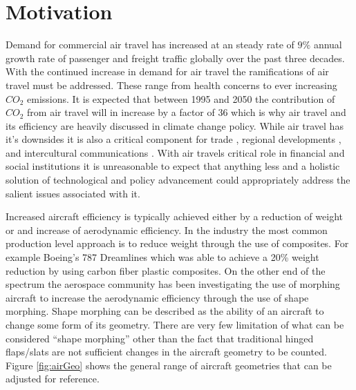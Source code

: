\documentclass[11pt]{ucthesis}
\begin{document}
\section{Motivation}
Demand for commercial air travel has increased at an steady rate of $9\%$ annual growth rate of passenger and freight traffic globally over the past three decades. \cite{upham2003environmental} With the continued increase in demand for air travel the ramifications of air travel must be addressed. These range from health concerns to ever increasing $CO_2$ emissions. It is expected that between 1995 and 2050 the contribution of $CO_2$ from air travel will in increase by a factor of 36 which is why air travel and its efficiency are heavily discussed in climate change policy. \cite{olsthoorn2001carbon} While air travel has it's downsides it is also a critical component for trade \cite{smith2001world}, regional developments \cite{marazzo2010air}, and intercultural communications \cite{adey2007flying}. With air travels critical role in financial and social institutions it is unreasonable to expect that anything less and a holistic solution of technological and policy advancement could appropriately address the salient issues associated with it.

Increased aircraft efficiency is typically achieved either by a reduction of weight or and increase of aerodynamic efficiency. In the industry the most common production level approach is to reduce weight through the use of composites. For example Boeing's 787 Dreamlines which was able to achieve a 20\% weight reduction by using carbon fiber plastic composites. \cite{hale2006boeing} On the other end of the spectrum the aerospace community has been investigating the use of morphing aircraft to increase the aerodynamic efficiency through the use of shape morphing.\cite{barbarino2011review,kuzmina2002review,sofla2010shape} Shape morphing can be described as the ability of an aircraft to change some form of its geometry. There are very few limitation of what can be considered ``shape morphing'' other than the fact that traditional hinged flaps/slats are not sufficient changes in the aircraft geometry to be counted. Figure \ref{fig:airGeo} shows the general range of aircraft geometries that can be adjusted for reference. 
\end{document}
